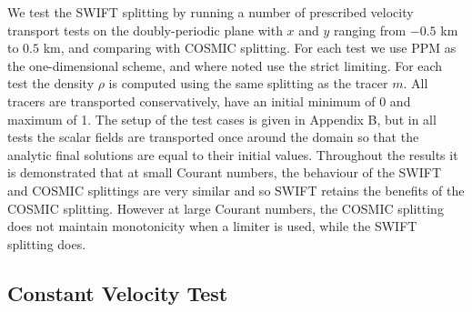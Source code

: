 \documentclass{ametsocV6.1}
\begin{document}
We test the SWIFT splitting by running a number of prescribed velocity transport tests on the doubly-periodic plane with $x$ and $y$ ranging from $-0.5$ km to $0.5$ km, and comparing with COSMIC splitting. For each test we use PPM as the one-dimensional scheme, and where noted use the strict limiting. For each test the density $\rho$ is computed using the same splitting as the tracer $m$.
All tracers are transported conservatively, have an initial minimum of 0 and maximum of 1.
The setup of the test cases is given in Appendix B, but in all tests the scalar fields are transported once around the domain so that the analytic final solutions are equal to their initial values.
Throughout the results it is demonstrated that at small Courant numbers, the behaviour of the SWIFT and COSMIC splittings are very similar and so SWIFT retains the benefits of the COSMIC splitting. However at large Courant numbers, the COSMIC splitting does not maintain monotonicity when a limiter is used, while the SWIFT splitting does.

\subsection{Constant Velocity Test} \label{sec:test1}
\end{document}
